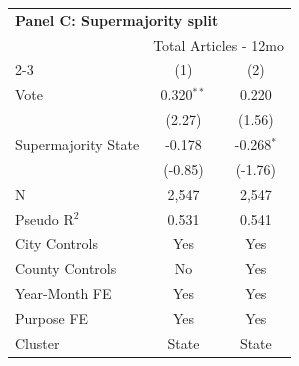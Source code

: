 \begingroup
\centering
\begin{tabular*}{\textwidth}{@{\extracolsep{\fill}}lcc}
\multicolumn{3}{l}{\textbf{Panel C: Supermajority split}}\\

\addlinespace
   \toprule
    & \multicolumn{2}{c}{Total Articles - 12mo}\\
   \cmidrule(lr){2-3}
                       & (1)          & (2)\\  
   \midrule 
   Vote                & 0.320$^{**}$ & 0.220\\   
                       & (2.27)      & (1.56)\\   
   Supermajority State & -0.178       & -0.268$^{*}$\\   
                       & (-0.85)     & (-1.76)\\   
   \hline
   N        & 2,547        & 2,547\\  
   Pseudo R$^2$        & 0.531        & 0.541\\  
   City Controls              & Yes           & Yes\\
   County Controls            & No            & Yes\\
   Year-Month FE       & Yes          & Yes\\  
   Purpose FE          & Yes          & Yes\\  
   Cluster              & State & State\\  
   \bottomrule
\end{tabular*}
\par\endgroup
